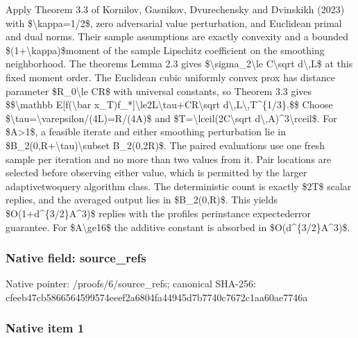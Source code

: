 \documentclass[10pt,a4paper]{article}
\begin{document}
Apply Theorem 3.3 of Kornilov, Gasnikov, Dvurechensky and Dvinskikh (2023) with \$\textbackslash{}kappa=1/2\$, zero adversarial value perturbation, and Euclidean primal and dual norms. Their sample assumptions are exactly convexity and a bounded \$(1+\textbackslash{}kappa)\$moment of the sample Lipschitz coefficient on the smoothing neighborhood. The theorems Lemma 2.3 gives \$\textbackslash{}sigma\_2\textbackslash{}le C\textbackslash{}sqrt d\textbackslash{},L\$ at this fixed moment order. The Euclidean cubic uniformly convex prox has distance parameter \$R\_0\textbackslash{}le CR\$ with universal constants, so Theorem 3.3 gives
\$\$\textbackslash{}mathbb E[f(\textbackslash{}bar x\_T)f\_*]\textbackslash{}le2L\textbackslash{}tau+CR\textbackslash{}sqrt d\textbackslash{},L\textbackslash{},T\textasciicircum{}\{1/3\}.\$\$
Choose \$\textbackslash{}tau=\textbackslash{}varepsilon/(4L)=R/(4A)\$ and \$T=\textbackslash{}lceil(2C\textbackslash{}sqrt d\textbackslash{},A)\textasciicircum{}3\textbackslash{}rceil\$. For \$A>1\$, a feasible iterate and either smoothing perturbation lie in \$B\_2(0,R+\textbackslash{}tau)\textbackslash{}subset B\_2(0,2R)\$. The paired evaluations use one fresh sample per iteration and no more than two values from it. Pair locations are selected before observing either value, which is permitted by the larger adaptivetwoquery algorithm class. The deterministic count is exactly \$2T\$ scalar replies, and the averaged output lies in \$B\_2(0,R)\$. This yields \$O(1+d\textasciicircum{}\{3/2\}A\textasciicircum{}3)\$ replies with the profiles perinstance expectederror guarantee. For \$A\textbackslash{}ge16\$ the additive constant is absorbed in \$O(d\textasciicircum{}\{3/2\}A\textasciicircum{}3)\$.


\subsubsection{Native field: source\_refs}


Native pointer: /proofs/6/source\_refs; canonical SHA-256: cfeeb47cb5866564599574ee\allowbreak{}ef2a6804fa44945d7b7740c7\allowbreak{}672c1aa60ae7746a



\subsubsection{Native item 1}
\end{document}
